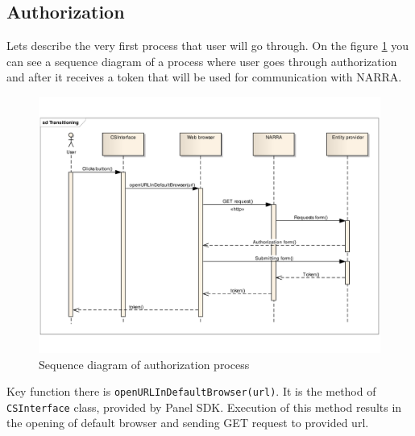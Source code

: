 \documentclass[thesis=B,english]{FITthesis}[2012/10/20]
\begin{document}
\subsection{Authorization}
Lets describe the very first process that user will go through. On the figure \ref{fig:seq_auth} you can see a sequence diagram of a process where user goes through authorization and after it receives a token that will be used for communication with NARRA.
	\begin{figure}
		\centering
		\includegraphics[width=1\textwidth]{AuthSeqDiag.pdf}
		\caption{Sequence diagram of authorization process}\label{fig:seq_auth}
	\end{figure}

Key function there is \texttt{openURLInDefaultBrowser(url)}. It is the method of \texttt{CSInterface} class, provided by Panel SDK. Execution of this method results in the opening of default browser and sending GET request to provided url.
\end{document}
